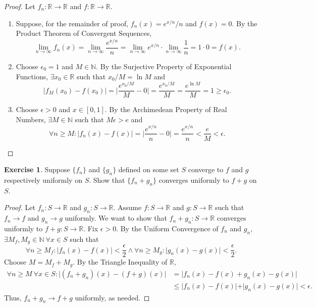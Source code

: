 \documentclass[12pt]{article}
\theoremstyle{definition}
\newtheorem{exercise}{Exercise}
\begin{document}
\begin{proof}
    Let \(f_{n} : \mathbb{R} \to \mathbb{R}\) and \(f : \mathbb{R} \to \mathbb{R}\).
    \begin{enumerate}[label=(\alph*)]
        \item Suppose, for the remainder of proof, \(f_n(x) = e^{x / n} / n\) and \(f(x) = 0\). By the Product Theorem of Convergent Sequences,
        \[
            \lim_{n \to \infty}f_n(x) = \lim_{n \to \infty}\frac{e^{x / n}}{n} = \lim_{n \to \infty}e^{x / n} \cdot \lim_{n \to \infty}\frac{1}{n} = 1 \cdot 0 = f(x).
        \]
        \item Choose \(\epsilon_0 = 1\) and \(M \in \mathbb{N}\). By the Surjective Property of Exponential Functions, \(\exists x_0 \in \mathbb{R}\) such that \(x_0 / M = \ln{M}\) and
        \[
            \vert f_M(x_0) - f(x_0) \vert = \bigg\vert \frac{e^{x_0 / M}}{M} - 0 \bigg\vert = \frac{e^{x_0/ M}}{M} = \frac{e^{\ln{M}}}{M} = 1\geq \epsilon_0.
        \]
        \item Choose \(\epsilon > 0\) and \(x \in [0, 1]\). By the Archimedean Property of Real Numbers, \(\exists M \in \mathbb{N}\) such that \(M\epsilon > e\) and
        \[
            \forall n \geq M : \vert f_n(x) - f(x) \vert = \bigg\vert \frac{e^{x / n}}{n} - 0 \bigg\vert = \frac{e^{x / n}}{n} < \frac{e}{M} < \epsilon.
        \]
    \end{enumerate}
\end{proof}

\begin{exercise}
    Suppose \(\{f_n\}\) and \(\{g_n\}\) defined on some set \(S\) converge to \(f\) and \(g\) respectively uniformly on \(S\). Show that \(\{f_n + g_n\}\) converges uniformly to \(f + g\) on \(S\).
\end{exercise}

\begin{proof}
    Let \(f_n : S \to \mathbb{R}\) and \(g_n : S \to \mathbb{R}\). Assume \(f : S \to \mathbb{R}\) and \(g : S \to \mathbb{R}\) such that \(f_n \to f\) and \(g_n \to g\) uniformly. We want to show that \(f_n + g_n : S \to \mathbb{R}\) converges uniformly to \(f + g : S \to \mathbb{R}\). Fix \(\epsilon > 0\). By the Uniform Convergence of \(f_n\) and \(g_n\), \(\exists M_f, M_g \in \mathbb{N} \ \forall x \in S\) such that
    \[
        \forall n \geq M_f : \vert f_n(x) - f(x) \vert < \frac{\epsilon}{2} \land \forall n \geq M_g : \vert g_n(x) - g(x) \vert < \frac{\epsilon}{2}.
    \]
    Choose \(M = M_f + M_g\). By the Triangle Inequality of \(\mathbb{R}\),
    \begin{align*}
        \forall n \geq M \ \forall x \in S : \vert (f_n + g_n)(x) - (f + g)(x) \vert &= \vert f_n(x) - f(x) + g_n(x) - g(x) \vert \\
        &\leq \vert f_n(x) - f(x) \vert + \vert g_n(x) - g(x) \vert <  \epsilon.
    \end{align*}
    Thus, \(f_n + g_n \to f + g\) uniformly, as needed.
\end{proof}
\end{document}
